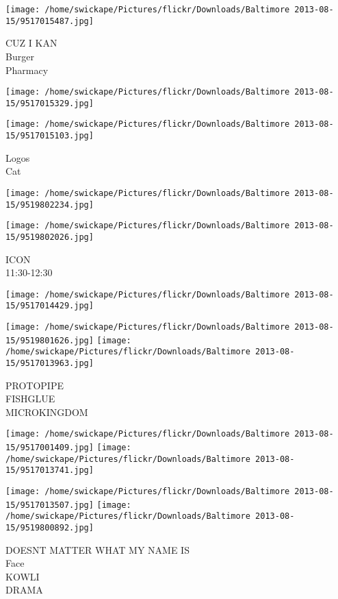 \documentclass[10pt,letterpaper]{article}
\begin{document}
\vspace{0.25in}
\texttt{[image: /home/swickape/Pictures/flickr/Downloads/Baltimore 2013-08-15/9517015487.jpg]}

CUZ I KAN\\
Burger\\
Pharmacy
\pagebreak

\texttt{[image: /home/swickape/Pictures/flickr/Downloads/Baltimore 2013-08-15/9517015329.jpg]}

\vspace{0.25in}
\texttt{[image: /home/swickape/Pictures/flickr/Downloads/Baltimore 2013-08-15/9517015103.jpg]}

Logos\\
Cat
\pagebreak

\texttt{[image: /home/swickape/Pictures/flickr/Downloads/Baltimore 2013-08-15/9519802234.jpg]}

\vspace{0.25in}
\texttt{[image: /home/swickape/Pictures/flickr/Downloads/Baltimore 2013-08-15/9519802026.jpg]}

ICON\\
11:30{-}12:30
\pagebreak

\texttt{[image: /home/swickape/Pictures/flickr/Downloads/Baltimore 2013-08-15/9517014429.jpg]}

\vspace{0.25in}
\texttt{[image: /home/swickape/Pictures/flickr/Downloads/Baltimore 2013-08-15/9519801626.jpg]}
\texttt{[image: /home/swickape/Pictures/flickr/Downloads/Baltimore 2013-08-15/9517013963.jpg]}

PROTOPIPE\\
FISHGLUE\\
MICROKINGDOM
\pagebreak

\texttt{[image: /home/swickape/Pictures/flickr/Downloads/Baltimore 2013-08-15/9517001409.jpg]}
\texttt{[image: /home/swickape/Pictures/flickr/Downloads/Baltimore 2013-08-15/9517013741.jpg]}

\texttt{[image: /home/swickape/Pictures/flickr/Downloads/Baltimore 2013-08-15/9517013507.jpg]}
\texttt{[image: /home/swickape/Pictures/flickr/Downloads/Baltimore 2013-08-15/9519800892.jpg]}

DOESNT MATTER WHAT MY NAME IS\\
Face\\
KOWLI\\
DRAMA
\pagebreak
\end{document}
